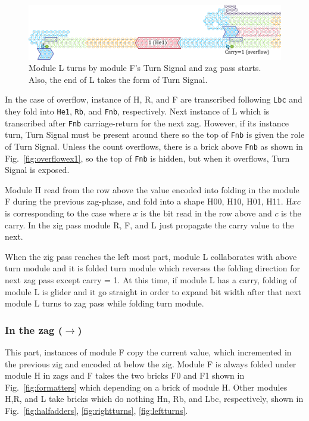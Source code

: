 \documentclass[runningheads]{llncs}
\begin{document}
\begin{figure}[tb]
\centering
\includegraphics[width=\linewidth]{fig/svg/CounterEx18_1.pdf}
\caption{
Module L turns by module F's Turn Signal and zag pass starts.
Also, the end of L takes the form of Turn Signal.
}
\label{fig:overflowex5}
\end{figure}



In the case of overflow, instance of H,  R, and F are transcribed following \texttt{Lbc} and they fold into \texttt{He1}, \texttt{Rb}, and \texttt{Fnb}, respectively.
Next instance of L which is transcribed after \texttt{Fnb} carriage-return for the next zag.
However, if its instance turn, Turn Signal must be present around there so the top of \texttt{Fnb} is given the role of Turn Signal.
Unless the count overflows, there is a brick above \texttt{Fnb} as shown in Fig.~\ref{fig:overflowex1}, so the top of \texttt{Fnb} is hidden, but when it overflows, Turn Signal is exposed.

Module H read from the row above the value encoded into folding in the module F during the previous zag-phase, and fold into a shape H00, H10, H01, H11.
H$xc$ is corresponding to the case where $x$ is the bit read in the row above and $c$ is the carry. 
In the zig pass module R, F, and L just propagate the carry value to the next.

When the zig pass reaches the left most part, module L collaborates with above turn module and it is folded turn module which reverses the folding direction for next zag pass except carry = 1.
At this time, if module L has a carry, folding of module L is glider and it go straight in order to expand bit width after that next module L turns to zag pass while folding turn module.

\subsubsection{In the zag ($\rightarrow$)}
This part, instances of module F copy the current value, which incremented in the previous zig and encoded at below the zig.
Module F is always folded under module H in zags and F takes the two bricks F0 and F1 shown in Fig.~\ref{fig:formatters} which depending on a brick of module H.
Other modules H,R, and L take bricks which do nothing Hn, Rb, and Lbc, respectively, shown in Fig.~\ref{fig:halfadders}, \ref{fig:rightturns}, \ref{fig:leftturns}. 
\end{document}
